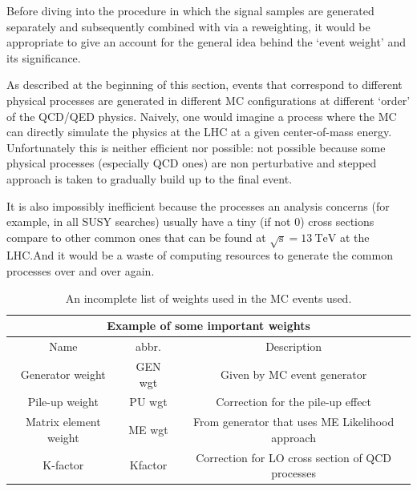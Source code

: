 Before diving into the procedure in which the signal samples are generated separately and
subsequently combined with via a reweighting, it would be appropriate to give
an account for the general idea behind the `event weight' and its significance.

As described at the beginning of this section, events that correspond to different physical
processes are generated in different MC configurations at different `order' of the QCD/QED physics.
Naively, one would imagine a process where the MC can directly simulate the physics at
the LHC at a given center-of-mass energy. Unfortunately this is neither efficient nor possible:
not possible because some physical processes (especially QCD ones) are non perturbative and
stepped approach is taken to gradually build up to the final event.

It is also impossibly inefficient because the processes an analysis concerns (for example, in all SUSY
searches) usually have a tiny (if not 0) cross sections compare to other common ones that can be
found at
$\sqrt{\mathrm{s}} = \SI{13}{\tera\electronvolt}$ at the LHC.\@ And it would be a waste of
computing resources to generate the common processes over and over again.

\begin{table}[]
\centering
\begin{tabular}{|c|c|c|}
\hline
\multicolumn{3}{|c|}{Example of some important weights}                                                                                       \\ \hline
Name                  & abbr.   & Description                                                                                                 \\ \hline
Generator weight      & GEN wgt & Given by MC event generator                                                                                 \\ \hline
Pile-up weight        & PU wgt  & Correction for the pile-up effect                                                                           \\ \hline
Matrix element weight & ME wgt  & From generator that uses ME Likelihood approach \\ \hline
K-factor              & Kfactor & Correction for LO cross section of QCD processes                                                         \\ \hline
\end{tabular}
\caption{An incomplete list of weights used in the MC events used.}
\label{tab:MC_wgts}
\end{table}

